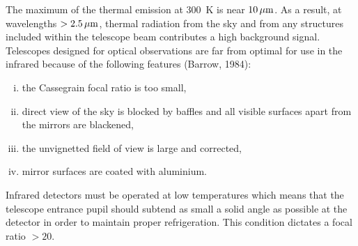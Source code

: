 The maximum of the thermal emission at \mbox{300 K} is near $\rm 10\,
\mu m$. As a result, at wavelengths $\rm > 2.5\,  \mu m$, thermal
radiation from the sky and from any structures included within the
telescope beam contributes a high background signal. Telescopes
designed for optical observations are far from optimal for use in the
infrared because of the following features (Barrow, 1984):
\begin{enumerate}[(iii)]\listsize
 \item the Cassegrain focal ratio is too small,
 \item direct view of the sky is blocked by baffles and all visible
       surfaces apart from the mirrors are blackened,
 \item the unvignetted field of view is large and corrected,
 \item mirror surfaces are coated with aluminium.
\end{enumerate}
Infrared detectors must be operated at low temperatures which
means that the telescope entrance pupil should subtend as small a
solid angle as possible at the detector in order to maintain proper
refrigeration. This condition dictates a focal ratio  $ > 20$.

